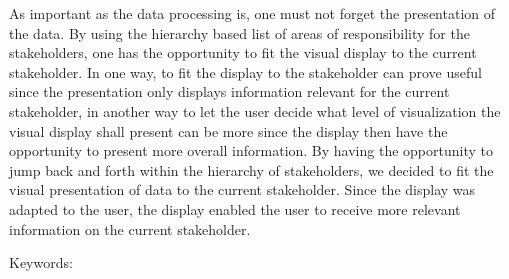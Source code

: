 As important as the data processing is, one must not forget the presentation of
the data. By using the hierarchy based list of areas of responsibility for the
stakeholders, one has the opportunity to fit the visual display to the current
stakeholder. In one way, to fit the display to the stakeholder can prove 
useful since the presentation only displays information relevant for the 
current stakeholder, in another way to let the user decide what level of 
visualization the visual display shall present can be more since the display 
then have the opportunity to present more overall information. By having the 
opportunity to jump
back and forth within the hierarchy of stakeholders, we decided to fit the 
visual presentation of data to the current stakeholder. Since the display was 
adapted to the user, the display enabled the user to receive more relevant 
information on the current stakeholder.



Keywords:

